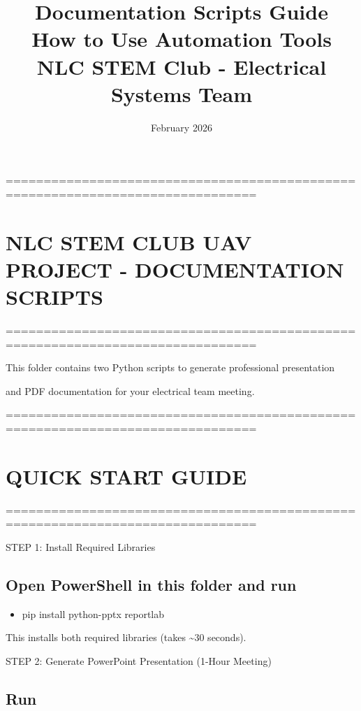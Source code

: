 \documentclass[11pt,letterpaper]{article}
\title{\Huge\textbf{Documentation Scripts Guide}\\
\Large How to Use Automation Tools\\
\large NLC STEM Club - Electrical Systems Team}
\author{February 2026}
\date{}
\begin{document}
\maketitle
\thispagestyle{empty}
\newpage
===============================================================================\par

\section{NLC STEM CLUB UAV PROJECT - DOCUMENTATION SCRIPTS}

===============================================================================\par

This folder contains two Python scripts to generate professional presentation\par

and PDF documentation for your electrical team meeting.\par

===============================================================================\par

\section{QUICK START GUIDE}

===============================================================================\par

STEP 1: Install Required Libraries\par

\subsection{Open PowerShell in this folder and run}

\begin{itemize}
  \item pip install python-pptx reportlab
\end{itemize}

This installs both required libraries (takes \textasciitilde{}30 seconds).\par

STEP 2: Generate PowerPoint Presentation (1-Hour Meeting)\par

\subsection{Run}
\end{document}
